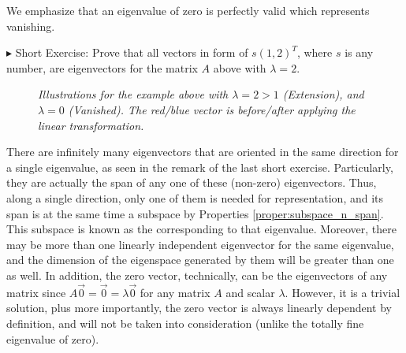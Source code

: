 We emphasize that an eigenvalue of zero is perfectly valid which represents vanishing. \par
$\blacktriangleright$ Short Exercise: Prove that all vectors in form of $s(1,2)^T$, where $s$ is any number, are eigenvectors for the matrix $A$ above with $\lambda = 2$.\footnotemark\par
\begin{figure}[h!]
\centering
{}
\caption{\textit{Illustrations for the example above with $\lambda = 2 > 1$ (Extension), and $\lambda = 0$ (Vanished). The red/blue vector is before/after applying the linear transformation.}}
\end{figure}
There are infinitely many eigenvectors that are oriented in the same direction for a single eigenvalue, as seen in the remark of the last short exercise. Particularly, they are actually the span of any one of these (non-zero) eigenvectors. Thus, along a single direction, only one of them is needed for representation, and its span is at the same time a subspace by Properties \ref{proper:subspace_n_span}. This subspace is known as the  corresponding to that eigenvalue. Moreover, there may be more than one linearly independent eigenvector for the same eigenvalue, and the dimension of the eigenspace generated by them will be greater than one as well. In addition, the zero vector, technically, can be the eigenvectors of any matrix since $A\vec{0} = \vec{0} = \lambda\vec{0}$ for any matrix $A$ and scalar $\lambda$. However, it is a trivial solution, plus more importantly, the zero vector is always linearly dependent by definition, and will not be taken into consideration (unlike the totally fine eigenvalue of zero).\par
